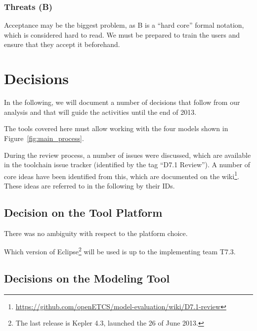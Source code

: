 \subsubsection{Threats (B)}

Acceptance may be the biggest problem, as B is a ``hard core'' formal notation, which is considered hard to read.  We must be prepared to train the users and ensure that they accept it beforehand.

\pagebreak

\section{Decisions}
\label{sec:dec}

In the following, we will document a number of decisions that follow from our analysis and that will guide the activities until the end of 2013.

The tools covered here must allow working with the four models shown in Figure~\ref{fig:main_process}.

During the review process, a number of issues were discussed, which are available in the toolchain issue tracker (identified by the tag ``D7.1 Review'').  A number of core ideas have been identified from this, which are documented on the wiki\footnote{\url{https://github.com/openETCS/model-evaluation/wiki/D7.1-review}}.  These ideas are referred to in the following by their IDs.

\subsection{Decision on the Tool Platform}
\label{sec:decision_platform}

There was no ambiguity with respect to the platform choice.


 Which version of Eclipse\footnote{The last release is Kepler 4.3, launched the 26 of June 2013.} will be used is up to the implementing team T7.3.

\subsection{Decisions on the Modeling Tool}

